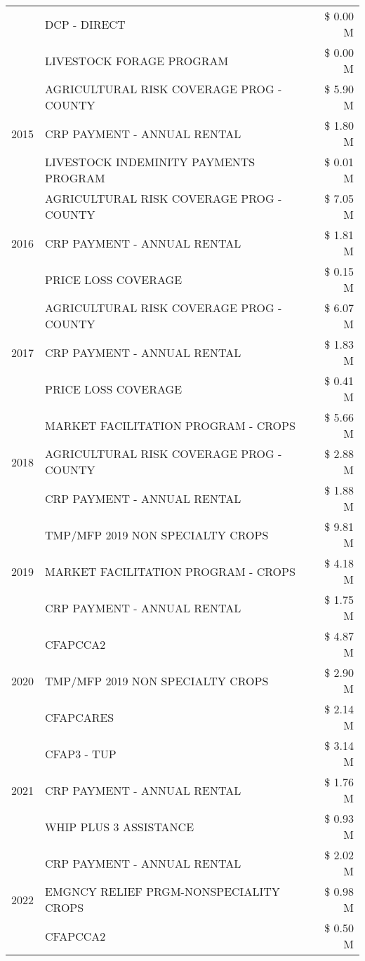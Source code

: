 \begin{tabular}{llr}
 & DCP - DIRECT & \$ 0.00 M \\
 & LIVESTOCK FORAGE PROGRAM & \$ 0.00 M \\
\cline{1-3}
\multirow[t]{3}{*}{2015} & AGRICULTURAL RISK COVERAGE PROG - COUNTY & \$ 5.90 M \\
 & CRP PAYMENT - ANNUAL RENTAL & \$ 1.80 M \\
 & LIVESTOCK INDEMINITY PAYMENTS PROGRAM & \$ 0.01 M \\
\cline{1-3}
\multirow[t]{3}{*}{2016} & AGRICULTURAL RISK COVERAGE PROG - COUNTY & \$ 7.05 M \\
 & CRP PAYMENT - ANNUAL RENTAL & \$ 1.81 M \\
 & PRICE LOSS COVERAGE & \$ 0.15 M \\
\cline{1-3}
\multirow[t]{3}{*}{2017} & AGRICULTURAL RISK COVERAGE PROG - COUNTY & \$ 6.07 M \\
 & CRP PAYMENT - ANNUAL RENTAL & \$ 1.83 M \\
 & PRICE LOSS COVERAGE & \$ 0.41 M \\
\cline{1-3}
\multirow[t]{3}{*}{2018} & MARKET FACILITATION PROGRAM - CROPS & \$ 5.66 M \\
 & AGRICULTURAL RISK COVERAGE PROG - COUNTY & \$ 2.88 M \\
 & CRP PAYMENT - ANNUAL RENTAL & \$ 1.88 M \\
\cline{1-3}
\multirow[t]{3}{*}{2019} & TMP/MFP 2019 NON SPECIALTY CROPS & \$ 9.81 M \\
 & MARKET FACILITATION PROGRAM - CROPS & \$ 4.18 M \\
 & CRP PAYMENT - ANNUAL RENTAL & \$ 1.75 M \\
\cline{1-3}
\multirow[t]{3}{*}{2020} & CFAPCCA2 & \$ 4.87 M \\
 & TMP/MFP 2019 NON SPECIALTY CROPS & \$ 2.90 M \\
 & CFAPCARES & \$ 2.14 M \\
\cline{1-3}
\multirow[t]{3}{*}{2021} & CFAP3 - TUP & \$ 3.14 M \\
 & CRP PAYMENT - ANNUAL RENTAL & \$ 1.76 M \\
 & WHIP PLUS 3 ASSISTANCE & \$ 0.93 M \\
\cline{1-3}
\multirow[t]{3}{*}{2022} & CRP PAYMENT - ANNUAL RENTAL & \$ 2.02 M \\
 & EMGNCY RELIEF PRGM-NONSPECIALITY CROPS & \$ 0.98 M \\
 & CFAPCCA2 & \$ 0.50 M \\
\cline{1-3}
\bottomrule
\end{tabular}
